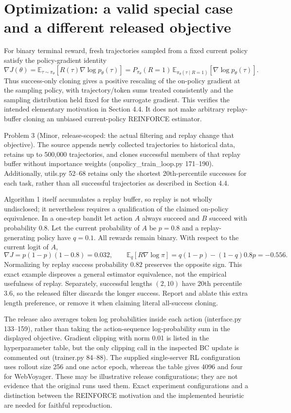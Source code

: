 \documentclass[10pt]{article}
\begin{document}
\section*{Optimization: a valid special case and a different released objective}
For binary terminal reward, fresh trajectories sampled from a fixed current policy satisfy the policy-gradient identity \[\nabla J(\theta)=\mathbb E_{\tau\sim\pi_\theta}
 [R(\tau)\nabla\log p_\theta(\tau)]
 =P_{\pi_\theta}(R=1)\,
 \mathbb E_{\pi_\theta(\tau\mid R=1)}[\nabla\log p_\theta(\tau)].\] Thus success-only cloning gives a positive rescaling of the on-policy gradient at the sampling policy, with trajectory/token sums treated consistently and the sampling distribution held fixed for the surrogate gradient. This verifies the intended elementary motivation in Section 4.4. It does not make arbitrary replay-buffer cloning an unbiased current-policy REINFORCE estimator.\par
Problem 3 (Minor, release-scoped: the actual filtering and replay change that objective).  The source appends newly collected trajectories to historical data, retains up to 500,000 trajectories, and clones successful members of that replay buffer without importance weights (onpolicy\_train\_loop.py 171–190). Additionally, utils.py 52–68 retains only the shortest 20th-percentile successes for each task, rather than all successful trajectories as described in Section 4.4.\par
Algorithm 1 itself accumulates a replay buffer, so replay is not wholly undisclosed; it nevertheless requires a qualification of the claimed on-policy equivalence. In a one-step bandit let action \(A\) always succeed and \(B\) succeed with probability \(0.8\). Let the current probability of \(A\) be \(p=0.8\) and a replay-generating policy have \(q=0.1\). All rewards remain binary. With respect to the current logit of \(A\), \[\nabla J=p(1-p)(1-0.8)=0.032,
 \qquad
 \mathbb E_q[R\nabla\log\pi]=q(1-p)-(1-q)0.8p=-0.556.\] Normalizing by replay success probability \(0.82\) preserves the opposite sign. This exact example disproves a general estimator equivalence, not the empirical usefulness of replay. Separately, successful lengths \((2,10)\) have 20th percentile 3.6, so the released filter discards the longer success. Report and ablate this extra length preference, or remove it when claiming literal all-success cloning.\par
The release also averages token log probabilities inside each action (interface.py 133–159), rather than taking the action-sequence log-probability sum in the displayed objective. Gradient clipping with norm 0.01 is listed in the hyperparameter table, but the only clipping call in the inspected BC update is commented out (trainer.py 84–88). The supplied single-server RL configuration uses rollout size 256 and one actor epoch, whereas the table gives 4096 and four for WebVoyager. These may be illustrative release configurations; they are not evidence that the original runs used them. Exact experiment configurations and a distinction between the REINFORCE motivation and the implemented heuristic are needed for faithful reproduction.\par
\end{document}
